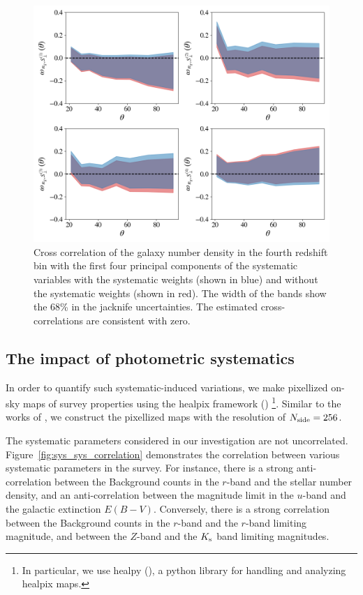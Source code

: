\documentclass[fleqn,usenatbib,useAMS]{mnras}
\begin{document}
\begin{figure}
    \includegraphics[width = \textwidth]{figures_tmp/sys/cross_60.png}
    \caption{Cross correlation of the galaxy number density in the fourth redshift bin with the first four principal components of the systematic variables with the systematic weights (shown in blue) and without the systematic weights (shown in red). The width of the bands show the 68\% in the jacknife uncertainties. The estimated cross-correlations are consistent with zero.}
    \label{fig:cross-correlation}
\end{figure}


\subsection{The impact of photometric systematics}

In order to quantify such systematic-induced variations, we make pixellized on-sky maps of survey properties using the healpix framework (\citealt{healpix}) \footnote{In particular, we use healpy (\citealt{healpy2019}), a python library for handling and analyzing healpix maps.}. Similar to the works of \citet{ross2017, rezaie2019}, we construct the pixellized maps with the resolution of $N_{\rm side} = 256$. 

The systematic parameters considered in our investigation are not uncorrelated. Figure~\ref{fig:sys_sys_correlation} demonstrates the correlation between various systematic parameters in the survey. For instance, there is a strong anti-correlation between the Background counts in the $r$-band and the stellar number density, and an anti-correlation between the magnitude limit in the $u$-band and the galactic extinction $E(B-V)$. Conversely, there is a strong correlation between the Background counts in the $r$-band and the $r$-band limiting magnitude, and between the $Z$-band and the $K_{\rm s}$ band limiting magnitudes. 
\end{document}
